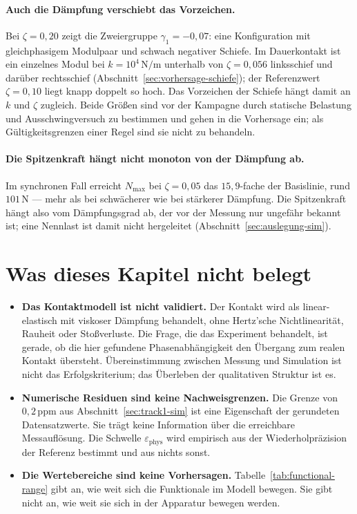\documentclass[12pt,a4paper]{report}
\begin{document}
\paragraph{Auch die Dämpfung verschiebt das Vorzeichen.} Bei
$\zeta = 0{,}20$ zeigt die Zweiergruppe $\gamma_1 = -0{,}07$: eine
Konfiguration mit gleichphasigem Modulpaar und schwach negativer
Schiefe. Im Dauerkontakt ist ein einzelnes Modul bei
$k = 10^{4}\,\mathrm{N/m}$ unterhalb von $\zeta = 0{,}056$ linksschief und
darüber rechtsschief (Abschnitt~\ref{sec:vorhersage-schiefe}); der
Referenzwert $\zeta = 0{,}10$ liegt knapp doppelt so hoch. Das
Vorzeichen der Schiefe hängt damit an $k$ und $\zeta$ zugleich. Beide
Größen sind vor der Kampagne durch statische Belastung und
Ausschwingversuch zu bestimmen und gehen in die Vorhersage ein; als
Gültigkeitsgrenzen einer Regel sind sie nicht zu behandeln.

\paragraph{Die Spitzenkraft hängt nicht monoton von der Dämpfung ab.}
Im synchronen Fall erreicht $N_{\max}$ bei $\zeta = 0{,}05$ das
$15{,}9$-fache der Basislinie, rund $101\,\mathrm{N}$ --- mehr als bei
schwächerer wie bei stärkerer Dämpfung. Die Spitzenkraft hängt also
vom Dämpfungsgrad ab, der vor der Messung nur ungefähr bekannt ist; eine
Nennlast ist damit nicht hergeleitet
(Abschnitt~\ref{sec:auslegung-sim}).

\section{Was dieses Kapitel nicht belegt}

\begin{itemize}
  \item \textbf{Das Kontaktmodell ist nicht validiert.} Der Kontakt wird
        als linear-elastisch mit viskoser Dämpfung behandelt, ohne
        Hertz'sche Nichtlinearität, Rauheit oder Stoßverluste. Die Frage,
        die das Experiment behandelt, ist gerade, ob die hier gefundene
        Phasenabhängigkeit den Übergang zum realen Kontakt übersteht.
        Übereinstimmung zwischen Messung und Simulation ist nicht das
        Erfolgskriterium; das Überleben der qualitativen Struktur ist es.
  \item \textbf{Numerische Residuen sind keine Nachweisgrenzen.} Die
        Grenze von $0{,}2\,\mathrm{ppm}$ aus
        Abschnitt~\ref{sec:track1-sim} ist eine Eigenschaft der gerundeten
        Datensatzwerte. Sie trägt keine Information über die erreichbare
        Messauflösung. Die Schwelle $\varepsilon_{\mathrm{phys}}$ wird
        empirisch aus der Wiederholpräzision der Referenz bestimmt und
        aus nichts sonst.
  \item \textbf{Die Wertebereiche sind keine Vorhersagen.}
        Tabelle~\ref{tab:functional-range} gibt an, wie weit sich die
        Funktionale im Modell bewegen. Sie gibt nicht an, wie weit sie
        sich in der Apparatur bewegen werden.
\end{itemize}
\end{document}
